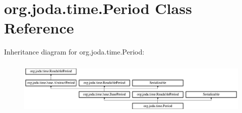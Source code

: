 \hypertarget{classorg_1_1joda_1_1time_1_1_period}{\section{org.\-joda.\-time.\-Period Class Reference}
\label{classorg_1_1joda_1_1time_1_1_period}
}
Inheritance diagram for org.\-joda.\-time.\-Period\-:\begin{figure}[H]
\begin{center}
\leavevmode
\includegraphics[height=2.641509cm]{classorg_1_1joda_1_1time_1_1_period}
\end{center}
\end{figure}
